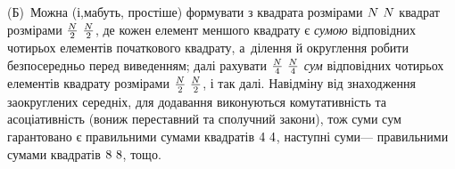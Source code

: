 (Б)~Можна (і,\nolinebreak[3] мабуть, простіше) формувати з квадрата розмірами ${N\,{\*}\,N}$ квадрат розмірами ${\frac{N}{2}\,{\*}\,\frac{N}{2}}$, де кожен елемент меншого квадрату є \emph{сумою} відповідних чотирьох елементів початкового квадрату, а~ділення й округлення робити безпосередньо перед виведенням; далі рахувати ${\frac{N}{4}\,{\*}\,\frac{N}{4}}$ \emph{сум} відповідних чотирьох елементів квадрату розмірами ${\frac{N}{2}\,{\*}\,\frac{N}{2}}$, і так далі.
%
На\nolinebreak[3] відміну від знаходження заокруглених середніх, для додавання виконуються комутативність та асоціативність (вони\nolinebreak[3] ж переставний та сполучний закони), тож суми сум гарантовано є правильними сумами квадратів ${4\,{\*}\,4}$, наступні суми\nolinebreak[3] --- правильними сумами квадратів ${8\,{\*}\,8}$, \mbox{тощо}.

